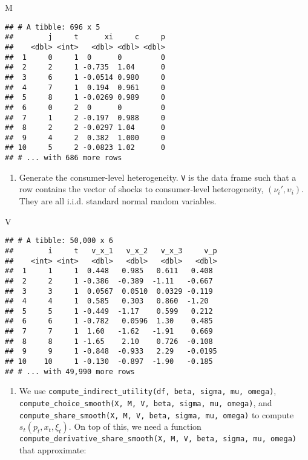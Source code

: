 \documentclass[
]{book}
\newenvironment{Shaded}{\begin{snugshade}}{\end{snugshade}}
\newcommand{\NormalTok}[1]{#1}
\providecommand{\tightlist}{%
  \setlength{\itemsep}{0pt}\setlength{\parskip}{0pt}}
\begin{document}
\begin{Shaded}
\begin{Highlighting}[]
\NormalTok{M}
\end{Highlighting}
\end{Shaded}

\begin{verbatim}
## # A tibble: 696 x 5
##        j     t      xi     c     p
##    <dbl> <int>   <dbl> <dbl> <dbl>
##  1     0     1  0      0         0
##  2     2     1 -0.735  1.04      0
##  3     6     1 -0.0514 0.980     0
##  4     7     1  0.194  0.961     0
##  5     8     1 -0.0269 0.989     0
##  6     0     2  0      0         0
##  7     1     2 -0.197  0.988     0
##  8     2     2 -0.0297 1.04      0
##  9     4     2  0.382  1.000     0
## 10     5     2 -0.0823 1.02      0
## # ... with 686 more rows
\end{verbatim}

\begin{enumerate}
\def\labelenumi{\arabic{enumi}.}
\setcounter{enumi}{3}
\tightlist
\item
  Generate the consumer-level heterogeneity. \texttt{V} is the data frame such that a row contains the vector of shocks to consumer-level heterogeneity, \((\nu_{i}', \upsilon_i)\). They are all i.i.d. standard normal random variables.
\end{enumerate}

\begin{Shaded}
\begin{Highlighting}[]
\NormalTok{V}
\end{Highlighting}
\end{Shaded}

\begin{verbatim}
## # A tibble: 50,000 x 6
##        i     t   v_x_1   v_x_2   v_x_3     v_p
##    <int> <int>   <dbl>   <dbl>   <dbl>   <dbl>
##  1     1     1  0.448   0.985   0.611   0.408 
##  2     2     1 -0.386  -0.389  -1.11   -0.667 
##  3     3     1  0.0567  0.0510  0.0329 -0.119 
##  4     4     1  0.585   0.303   0.860  -1.20  
##  5     5     1 -0.449  -1.17    0.599   0.212 
##  6     6     1 -0.782   0.0596  1.30    0.485 
##  7     7     1  1.60   -1.62   -1.91    0.669 
##  8     8     1 -1.65    2.10    0.726  -0.108 
##  9     9     1 -0.848  -0.933   2.29   -0.0195
## 10    10     1 -0.130  -0.897  -1.90   -0.185 
## # ... with 49,990 more rows
\end{verbatim}

\begin{enumerate}
\def\labelenumi{\arabic{enumi}.}
\setcounter{enumi}{4}
\tightlist
\item
  We use \texttt{compute\_indirect\_utility(df,\ beta,\ sigma,\ mu,\ omega)}, \texttt{compute\_choice\_smooth(X,\ M,\ V,\ beta,\ sigma,\ mu,\ omega)}, and \texttt{compute\_share\_smooth(X,\ M,\ V,\ beta,\ sigma,\ mu,\ omega)} to compute \(s_t(p_t, x_t, \xi_t)\). On top of this, we need a function \texttt{compute\_derivative\_share\_smooth(X,\ M,\ V,\ beta,\ sigma,\ mu,\ omega)} that approximate:
\end{enumerate}
\end{document}
